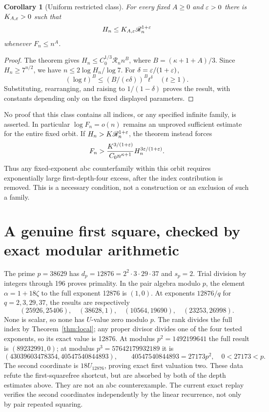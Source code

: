 \documentclass[11pt]{amsart}
\newtheorem{corollary}[theorem]{Corollary}
\theoremstyle{definition}\newtheorem{definition}[theorem]{Definition}
\theoremstyle{remark}\newtheorem{remark}[theorem]{Remark}
\begin{document}
\begin{corollary}[Uniform restricted class]\label{cor:class}
For every fixed $A\ge0$ and $\varepsilon>0$ there is $K_{A,\varepsilon}>0$ such that
\[
 H_n\le K_{A,\varepsilon}\mathscr R_n^{1+\varepsilon}
\]
whenever $F_n\le n^A$.
\end{corollary}
\begin{proof}
The theorem gives $H_n\le C_0^{1/3}\mathscr R_n n^B$, where $B=(\kappa+1+A)/3$. Since $H_n\ge7^{n/2}$, we have $n\le2\log H_n/\log7$. For $\delta=\varepsilon/(1+\varepsilon)$,
\[
 (\log t)^B\le(B/(e\delta))^B t^\delta\quad(t\ge1).
\]
Substituting, rearranging, and raising to $1/(1-\delta)$ proves the result, with constants depending only on the fixed displayed parameters.
\end{proof}
No proof that this class contains all indices, or any specified infinite family, is asserted. In particular $\log F_n=o(n)$ remains an unproved sufficient estimate for the entire fixed orbit. If $H_n>K\mathscr R_n^{1+\varepsilon}$, the theorem instead forces
\[
 F_n>\frac{K^{3/(1+\varepsilon)}}{C_0n^{\kappa+1}}
             H_n^{3\varepsilon/(1+\varepsilon)}.
\]
Thus any fixed-exponent abc counterfamily within this orbit requires exponentially large first-depth-four excess, after the index contribution is removed. This is a necessary condition, not a construction or an exclusion of such a family.

\section{A genuine first square, checked by exact modular arithmetic}
The prime $p=38629$ has $d_p=12876=2^2\cdot3\cdot29\cdot37$ and $s_p=2$. Trial division by integers through 196 proves primality. In the pair algebra modulo $p$, the element $\alpha=1+18\zeta$ to the full exponent 12876 is $(1,0)$. At exponents $12876/q$ for $q=2,3,29,37$, the results are respectively
\[
 (25926,25406),\quad(38628,1),\quad
 (10564,19690),\quad(23253,26998).
\]
None is scalar, so none has $U$-value zero modulo $p$. The rank divides the full index by Theorem~\ref{thm:local}; any proper divisor divides one of the four tested exponents, so its exact value is 12876.
At modulus $p^2=1492199641$ the full result is $(89232991,0)$; at modulus $p^3=57642179932189$ it is
\[
 (43039603478354,40547540844893),\qquad
 40547540844893=27173p^2,\quad0<27173<p.
\]
The second coordinate is $18U_{12876}$, proving exact first valuation two. These data refute the first-squarefree shortcut, but are absorbed by both of the depth estimates above. They are not an abc counterexample. The current exact replay verifies the second coordinates independently by the linear recurrence, not only by pair repeated squaring.
\end{document}
